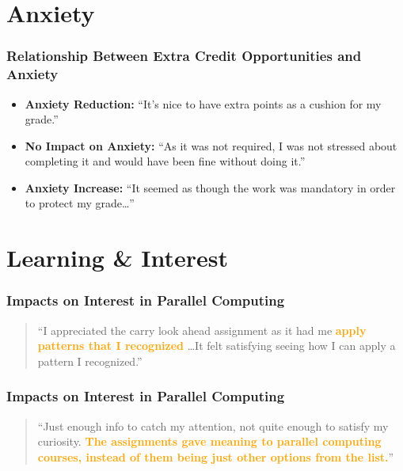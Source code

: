 \documentclass{beamer}
\begin{document}
\section{Anxiety}

\begin{frame}
    \frametitle{Relationship Between Extra Credit Opportunities and Anxiety}

    \begin{figure}
      
    \end{figure}

    \begin{itemize}
      \item \textbf{Anxiety Reduction:}
          ``It's nice to have extra points as a cushion for my grade.''
      \item \textbf{No Impact on Anxiety:}
          ``As it was not required, I was not stressed about completing it and would have been fine without doing it.''
      \item \textbf{Anxiety Increase:}
          ``It seemed as though the work was mandatory in order to protect my grade\ldots''
    \end{itemize}

\end{frame}

\section{Learning \&  Interest}

\begin{frame}
    \frametitle{Impacts on Interest in Parallel Computing}

    \begin{figure}
      
    \end{figure}
    \vfill
    \begin{quote}
      ``I appreciated the carry look ahead assignment as it had me 
      \textcolor{orange}{\textbf{apply
      patterns that I recognized}} \ldots It felt satisfying seeing how I can
      apply a pattern I recognized.''
    \end{quote}
\end{frame}

\begin{frame}
    \frametitle{Impacts on Interest in Parallel Computing}

    \begin{figure}
      
    \end{figure}
    \vfill
    \begin{quote}
      ``Just enough info to catch my attention, not quite enough to satisfy my
      curiosity. \textcolor{orange}{\textbf{The assignments gave meaning to parallel computing courses,
      instead of them being just other options from the list.}}''
    \end{quote}
    \vfill
\end{frame}
\end{document}
